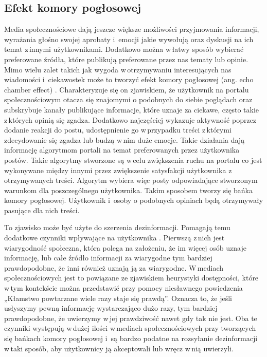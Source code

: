 \subsection{Efekt komory pogłosowej}
Media społecznościowe dają jeszcze większe możliwości przyjmowania informacji, wyrażania głośno swojej aprobaty i \,emocji jakie wywołują oraz dyskusji na ich temat z\,innymi użytkownikami. Dodatkowo można w\,łatwy sposób wybierać preferowane źródła, które publikują preferowane przez nas tematy lub opinie. Mimo wielu zalet takich jak wygoda w\,otrzymywaniu interesujących nas wiadomości i \,ciekawostek może to tworzyć efekt komory pogłosowej (ang. echo chamber effect) \cite{garimella2018political}. Charakteryzuje się on zjawiskiem, że użytkownik na portalu społecznościowym otacza się znajomymi o podobnych do siebie poglądach oraz subskrybuje kanały publikujące informacje, które uznaje za ciekawe, często takie z\,których opinią się zgadza. Dodatkowo najczęściej wykazuje aktywność poprzez dodanie reakcji do postu, udostępnienie go w\,przypadku treści z\,którymi zdecydowanie się zgadza lub budzą w\,nim duże emocje. Takie działania dają informację algorytmom portali na temat preferowanych przez użytkownika postów. Takie algorytmy stworzone są w\,celu zwiększenia ruchu na portalu co jest wykonywane między innymi przez zwiększenie satysfakcji użytkownika z\,otrzymywanych treści.  Algorytm wybiera więc posty odpowiadające stworzonym warunkom dla poszczególnego użytkownika. Takim sposobem tworzy się bańka komory pogłosowej. Użytkownik i \,osoby o podobnych opiniach będą otrzymywały pasujące dla nich treści. 
\par To zjawisko może być użyte do szerzenia dezinformacji. Pomagają temu dodatkowe czynniki wpływające na użytkownika  \cite{shu2017fake}. Pierwszą z\,nich jest wiarygodność społeczna, która polega na założeniu, że im więcej osób uznaje informację, lub całe źródło informacji za wiarygodne tym bardziej prawdopodobne, że inni również uznają ją za wiarygodne. W\,mediach społecznościowych jest to powiązane ze zjawiskiem heurystyki dostępności, które w\,tym kontekście można przedstawić przy pomocy niesławnego powiedzenia „Kłamstwo powtarzane wiele razy staje się prawdą”. Oznacza to, że jeśli usłyszymy pewną informację wystarczająco dużo razy, tym bardziej prawdopodobne, że uwierzymy w\,jej prawdziwość nawet gdy tak nie jest. Oba te czynniki występują w\,dużej ilości w\,mediach społecznościowych przy tworzących się bańkach komory pogłosowej i \,są bardzo podatne na rozsyłanie dezinformacji w\,taki sposób, aby użytkownicy ją akceptowali lub wręcz w\,nią uwierzyli. 

